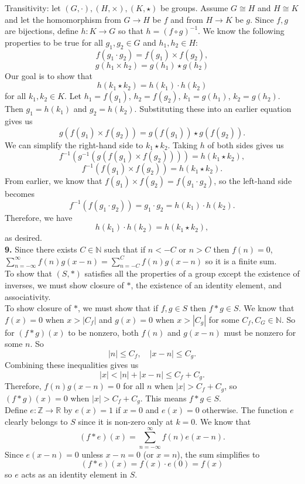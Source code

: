 \documentclass{article}
\newcommand{\R}{\mathbb{R}}
\newcommand{\N}{\mathbb{N}}
\newcommand{\Z}{\mathbb{Z}}
\begin{document}
Transitivity: let $(G, \cdot), (H, \times), (K, \star)$ be groups. Assume $G\cong H$ and $H\cong K$ and let the homomorphism from $G\to H$ be $f$ and from $H\to K$ be $g$. Since $f, g$ are bijections, define $h: K\to G$ so that $h = (f\circ g)^{-1}$. We know the following properties to be true for all $g_1, g_2 \in G$ and $h_1, h_2 \in H$:
$$f(g_1\cdot g_2) = f(g_1)\times f(g_2),$$
$$g(h_1\times h_2) = g(h_1)\star g(h_2)$$
Our goal is to show that $$h(k_1\star k_2) = h(k_1)\cdot h(k_2)$$ for all $k_1, k_2 \in K$.
Let $h_1 = f(g_1)$, $h_2 = f(g_2)$, $k_1 = g(h_1)$, $k_2 = g(h_2)$. Then $g_1 = h(k_1)$ and $g_2 = h(k_2)$. Substituting these into an earlier equation gives us
$$g(f(g_1)\times f(g_2)) = g(f(g_1))\star g(f(g_2)).$$
We can simplify the right-hand side to $k_1\star k_2$. Taking $h$ of both sides gives us
$$f^{-1}(g^{-1}(g(f(g_1)\times f(g_2)))) = h(k_1\star k_2),$$
$$f^{-1}(f(g_1)\times f(g_2)) = h(k_1\star k_2).$$
From earlier, we know that $f(g_1)\times f(g_2) = f(g_1\cdot g_2)$, so the left-hand side becomes
$$f^{-1}(f(g_1\cdot g_2)) = g_1\cdot g_2 = h(k_1)\cdot h(k_2).$$
Therefore, we have
$$h(k_1)\cdot h(k_2) = h(k_1\star k_2),$$
as desired. \\

\textbf{9.} Since there exists $C \in \N$ such that if $n < -C$ or $n > C$ then $f(n) = 0$, $\sum_{n = -\infty}^\infty f(n)g(x - n) = \sum_{n = -C}^C f(n)g(x - n)$ so it is a finite sum. \\

To show that $(S, *)$ satisfies all the properties of a group except the existence of inverses, we must show closure of $*$, the existence of an identity element, and associativity. \\

To show closure of $*$, we must show that if $f, g \in S$ then $f * g \in S$. We know that $f(x) = 0$ when $x > |C_f|$ and $g(x) = 0$ when $x > |C_g|$ for some $C_f, C_G \in \N$. So for $(f * g)(x)$ to be nonzero, both $f(n)$ and $g(x - n)$ must be nonzero for some $n$. So
$$|n| \le C_f,\quad |x - n| \le C_g.$$
Combining these inequalities gives us
$$|x| < |n| + |x - n| \le C_f + C_g.$$
Therefore, $f(n)g(x - n) = 0$ for all $n$ when $|x| > C_f + C_g$, so $(f * g)(x) = 0$ when $|x| > C_f + C_g$. This means $f * g \in S$. \\

Define $e: \Z \to \R$ by $e(x) = 1$ if $x = 0$ and $e(x) = 0$ otherwise. The function $e$ clearly belongs to $S$ since it is non-zero only at $k = 0$. We know that
$$(f * e)(x) = \sum_{n = -\infty}^\infty f(n)e(x - n).$$
Since $e(x - n) = 0$ unless $x - n = 0$ (or $x = n$), the sum simplifies to
$$(f * e)(x) = f(x)\cdot e(0) = f(x)$$
so $e$ acts as an identity element in $S$. \\
\end{document}
